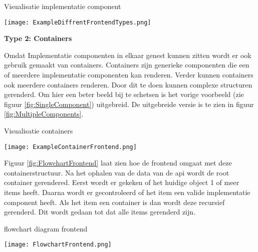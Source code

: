 \begin{graphic}
    \captionsetup{type=figure}
    \caption{Visualisatie implementatie component}
    \texttt{[image: ExampleDiffrentFrontendTypes.png]}
    \label{fig:SingleComponent}
\end{graphic}

\whitespace[2]
\textbf{Type 2: Containers}

\whitespace
Omdat Implementatie componenten in elkaar genest kunnen zitten wordt er ook gebruik gemaakt van containers.
Containers zijn generieke componenten die een of meerdere implementatie componenten kan renderen.
Verder kunnen containers ook meerdere containers renderen.
Door dit te doen kunnen complexe structuren gerenderd.
Om hier een beter beeld bij te schetsen is het vorige voorbeeld (zie figuur \ref{fig:SingleComponent}) uitgebreid.
De uitgebreide versie is te zien in figuur \ref{fig:MultipleComponents}.

\whitespace
\begin{graphic}
    \captionsetup{type=figure}
    \caption{Visualisatie containers}
    \texttt{[image: ExampleContainerFrontend.png]}
    \label{fig:MultipleComponents}
\end{graphic}

\newpage

\whitespace
Figuur \ref{fig:FlowchartFrontend} laat zien hoe de frontend omgaat met deze containerstructuur.
Na het ophalen van de data van de api wordt de root container gerendered.
Eerst wordt er gekeken of het huidige object 1 of meer items heeft.
Daarna wordt er gecontroleerd of het item een valide implementatie component heeft.
Als het item een container is dan wordt deze recursief gerenderd.
Dit wordt gedaan tot dat alle items gerenderd zijn.

\whitespace
\begin{graphic}
    \captionsetup{type=figure}
    \caption{flowchart diagram frontend}
    \texttt{[image: FlowchartFrontend.png]}
    \label{fig:FlowchartFrontend}
\end{graphic}
